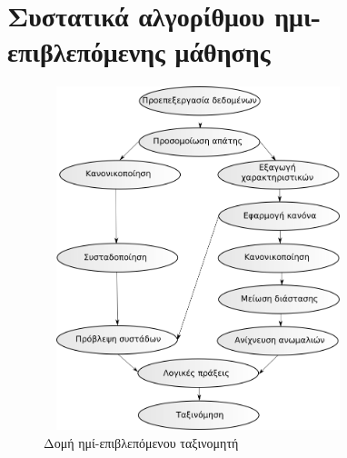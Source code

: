 \section{Συστατικά αλγορίθμου ημι-επιβλεπόμενης μάθησης}
\begin{figure}
\centering
 \includegraphics[width=90mm, height=100mm]{../../plots/systems/semi_supervised.png}
 \caption{Δομή ημί-επιβλεπόμενου ταξινομητή}
\label{fig:semisupervisedsystem}
 \end{figure}


